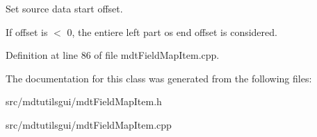 Set source data start offset. 

If offset is $<$ 0, the entiere left part os end offset is considered. 

Definition at line 86 of file mdtFieldMapItem.cpp.



The documentation for this class was generated from the following files:\begin{DoxyCompactItemize}
\item 
src/mdtutilsgui/mdtFieldMapItem.h\item 
src/mdtutilsgui/mdtFieldMapItem.cpp\end{DoxyCompactItemize}
